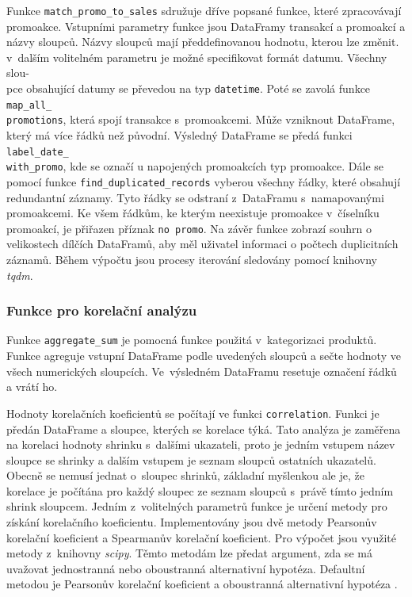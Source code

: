 Funkce \texttt{match\_promo\_to\_sales} sdružuje dříve popsané funkce, které zpracovávají promoakce. Vstupními parametry funkce jsou DataFramy transakcí a promoakcí a názvy sloupců. Názvy sloupců mají předdefinovanou hodnotu, kterou lze změnit. v~dalším volitelném parametru je možné specifikovat formát datumu. Všechny slou-\\pce obsahující datumy se převedou na typ \texttt{datetime}. Poté se zavolá funkce \texttt{map\_all\_\\promotions}, která spojí transakce s~promoakcemi. Může vzniknout DataFrame, který má více řádků než původní. Výsledný DataFrame se předá funkci \texttt{label\_date\_\\with\_promo}, kde se označí u napojených promoakcích typ promoakce. Dále se pomocí funkce \texttt{find\_duplicated\_records} vyberou všechny řádky, které obsahují redundantní záznamy. Tyto řádky se odstraní z~DataFramu s~namapovanými promoakcemi. Ke všem řádkům, ke kterým neexistuje promoakce v~číselníku promoakcí, je přiřazen příznak \texttt{no promo}. Na závěr funkce zobrazí souhrn o velikostech dílčích DataFramů, aby měl uživatel informaci o počtech duplicitních záznamů. Během výpočtu jsou procesy iterování sledovány pomocí knihovny \emph{tqdm}.

\subsubsection*{Funkce pro korelační analýzu}

Funkce \texttt{aggregate\_sum} je pomocná funkce použitá v~kategorizaci produktů. Funkce agreguje vstupní DataFrame podle uvedených sloupců a sečte hodnoty ve všech numerických sloupcích. Ve~výsledném DataFramu resetuje označení řádků a vrátí ho.

Hodnoty korelačních koeficientů se počítají ve funkci \texttt{correlation}. Funkci je předán DataFrame a sloupce, kterých se korelace týká. Tato analýza je zaměřena na korelaci hodnoty shrinku s~dalšími ukazateli, proto je jedním vstupem název sloupce se shrinky a dalším vstupem je seznam sloupců ostatních ukazatelů. Obecně se nemusí jednat o~sloupec shrinků, základní myšlenkou ale je, že korelace je počítána pro každý sloupec ze seznam sloupců s~právě tímto jedním shrink sloupcem. Jedním z~volitelných parametrů funkce je určení metody pro získání korelačního koeficientu. Implementovány jsou dvě metody Pearsonův korelační koeficient a Spearmanův korelační koeficient. Pro výpočet jsou využité metody z~knihovny \emph{scipy}. Těmto metodám lze předat argument, zda se má uvažovat jednostranná nebo oboustranná alternativní hypotéza. Defaultní metodou je Pearsonův korelační koeficient a oboustranná alternativní hypotéza \cite{bib:scipyPearson}.

